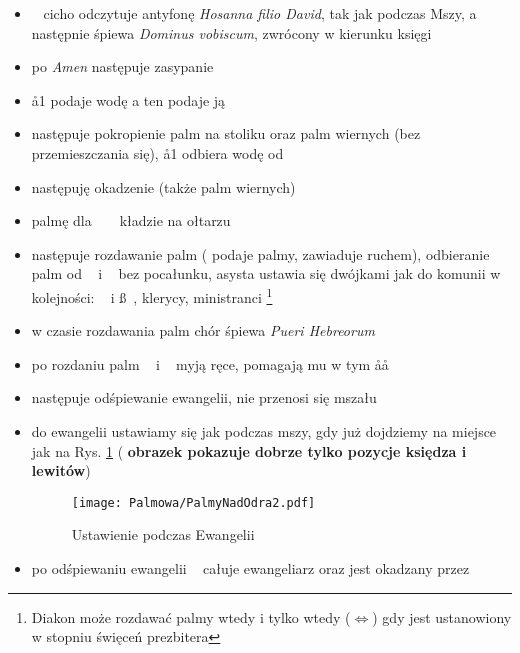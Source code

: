 \begin{itemize}
	\item \ii~ cicho odczytuje antyfonę \textit{Hosanna filio David}, tak jak
	      podczas Mszy, a następnie śpiewa \textit{Dominus vobiscum}, zwrócony w
	      kierunku księgi
	\item po \textit{Amen} następuje zasypanie
	\item \aa1 podaje wodę  a ten podaje ją \dd
	\item następuje pokropienie palm na stoliku oraz palm wiernych (bez
		przemieszczania się), \aa1 odbiera wodę od \dd
	\item następuję okadzenie (także palm wiernych)
	\item palmę dla \ii~ \dd~ kładzie na ołtarzu
	\item następuje rozdawanie palm ( podaje palmy,  zawiaduje ruchem),
				odbieranie palm od \ii~ i \dd~ bez pocałunku, asysta ustawia się
				dwójkami jak do komunii w kolejności: \dd~ i \ss~, klerycy, ministranci
				\footnote{Diakon może rozdawać palmy wtedy i tylko wtedy ($\iff$) gdy
					jest ustanowiony w stopniu święceń prezbitera}
	\item w czasie rozdawania palm chór śpiewa \textit{Pueri Hebreorum}
	\item po rozdaniu palm \ii~ i \dd~ myją ręce, pomagają mu w tym \aa\aa
	\item następuje odśpiewanie ewangelii, nie przenosi się mszału
	\item do ewangelii ustawiamy się jak podczas mszy, gdy już dojdziemy na
	      miejsce jak na Rys. \ref{fig:ewangelia} ( \textbf{obrazek
				pokazuje dobrze tylko pozycje księdza i lewitów})


	      \begin{figure}[h!]
		      \centering
		      \texttt{[image: Palmowa/PalmyNadOdra2.pdf]}
		      \caption{Ustawienie podczas Ewangelii}
		      \label{fig:ewangelia}
	      \end{figure}

	\item po odśpiewaniu ewangelii \ii~ całuje ewangeliarz oraz jest okadzany
	      przez \dd


\end{itemize}

